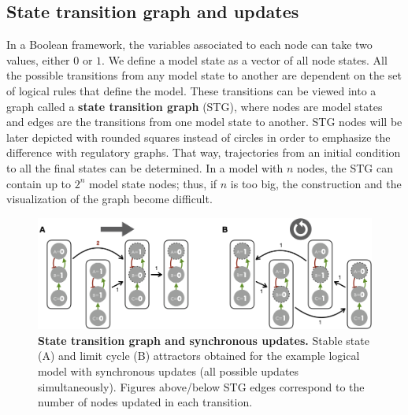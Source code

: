 \documentclass[a4paper,12pt,twoside,onecolumn,openright,final,oldfontcommands]{memoir}
\begin{document}
\subsection{State transition graph and
updates}\label{state-transition-graph-and-updates}

In a Boolean framework, the variables associated to each node can take
two values, either \(0\) or \(1\). We define a model state as a vector
of all node states. All the possible transitions from any model state to
another are dependent on the set of logical rules that define the model.
These transitions can be viewed into a graph called a \textbf{state
transition graph} (STG), where nodes are model states and edges are the
transitions from one model state to another. STG nodes will be later
depicted with rounded squares instead of circles in order to emphasize
the difference with regulatory graphs. That way, trajectories from an
initial condition to all the final states can be determined. In a model
with \(n\) nodes, the STG can contain up to \(2^n\) model state nodes;
thus, if \(n\) is too big, the construction and the visualization of the
graph become difficult.

\begin{figure}

{\centering \includegraphics[width=0.9\linewidth]{fig/synchronous} 

}

\caption[State transition graph and synchronous updates]{\textbf{State transition graph and synchronous
updates.} Stable state (A) and limit cycle (B) attractors obtained for
the example logical model with synchronous updates (all possible updates
simultaneously). Figures above/below STG edges correspond to the number
of nodes updated in each transition.}\label{fig:synchronous}
\end{figure}
\end{document}
